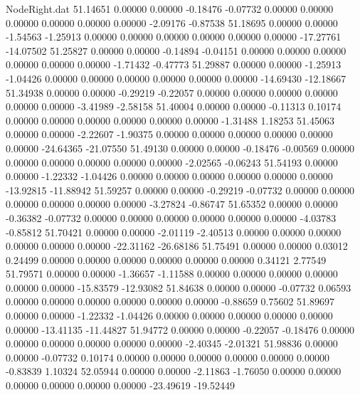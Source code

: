 \begin{filecontents}{NodeRight.dat}
  51.14651    0.00000    0.00000    -0.18476   -0.07732    0.00000    0.00000    0.00000    0.00000    0.00000    0.00000   -2.09176   -0.87538
  51.18695    0.00000    0.00000    -1.54563   -1.25913    0.00000    0.00000    0.00000    0.00000    0.00000    0.00000  -17.27761  -14.07502
  51.25827    0.00000    0.00000    -0.14894   -0.04151    0.00000    0.00000    0.00000    0.00000    0.00000    0.00000   -1.71432   -0.47773
  51.29887    0.00000    0.00000    -1.25913   -1.04426    0.00000    0.00000    0.00000    0.00000    0.00000    0.00000  -14.69430  -12.18667
  51.34938    0.00000    0.00000    -0.29219   -0.22057    0.00000    0.00000    0.00000    0.00000    0.00000    0.00000   -3.41989   -2.58158
  51.40004    0.00000    0.00000    -0.11313    0.10174    0.00000    0.00000    0.00000    0.00000    0.00000    0.00000   -1.31488    1.18253
  51.45063    0.00000    0.00000    -2.22607   -1.90375    0.00000    0.00000    0.00000    0.00000    0.00000    0.00000  -24.64365  -21.07550
  51.49130    0.00000    0.00000    -0.18476   -0.00569    0.00000    0.00000    0.00000    0.00000    0.00000    0.00000   -2.02565   -0.06243
  51.54193    0.00000    0.00000    -1.22332   -1.04426    0.00000    0.00000    0.00000    0.00000    0.00000    0.00000  -13.92815  -11.88942
  51.59257    0.00000    0.00000    -0.29219   -0.07732    0.00000    0.00000    0.00000    0.00000    0.00000    0.00000   -3.27824   -0.86747
  51.65352    0.00000    0.00000    -0.36382   -0.07732    0.00000    0.00000    0.00000    0.00000    0.00000    0.00000   -4.03783   -0.85812
  51.70421    0.00000    0.00000    -2.01119   -2.40513    0.00000    0.00000    0.00000    0.00000    0.00000    0.00000  -22.31162  -26.68186
  51.75491    0.00000    0.00000     0.03012    0.24499    0.00000    0.00000    0.00000    0.00000    0.00000    0.00000    0.34121    2.77549
  51.79571    0.00000    0.00000    -1.36657   -1.11588    0.00000    0.00000    0.00000    0.00000    0.00000    0.00000  -15.83579  -12.93082
  51.84638    0.00000    0.00000    -0.07732    0.06593    0.00000    0.00000    0.00000    0.00000    0.00000    0.00000   -0.88659    0.75602
  51.89697    0.00000    0.00000    -1.22332   -1.04426    0.00000    0.00000    0.00000    0.00000    0.00000    0.00000  -13.41135  -11.44827
  51.94772    0.00000    0.00000    -0.22057   -0.18476    0.00000    0.00000    0.00000    0.00000    0.00000    0.00000   -2.40345   -2.01321
  51.98836    0.00000    0.00000    -0.07732    0.10174    0.00000    0.00000    0.00000    0.00000    0.00000    0.00000   -0.83839    1.10324
  52.05944    0.00000    0.00000    -2.11863   -1.76050    0.00000    0.00000    0.00000    0.00000    0.00000    0.00000  -23.49619  -19.52449

\end{filecontents}
